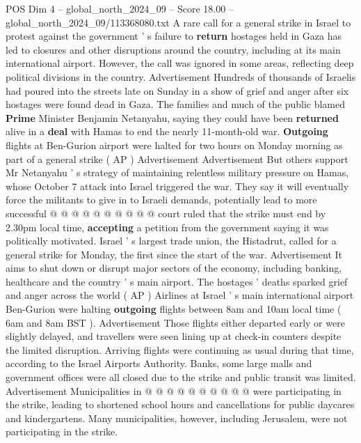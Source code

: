 \begin{textsample}{POS Dim 4 – global\_north\_2024\_09 – Score 18.00 – global\_north\_2024\_09/113368080.txt}  \label{ex:f4_pos_329}
A rare call for a general strike in Israel to protest against the government ' s failure to \textbf{return} hostages held in Gaza has led to closures and other disruptions around the country, including at its main international airport.
However, the call was ignored in some areas, reflecting deep political divisions in the country.
Advertisement Hundreds of thousands of Israelis had poured into the streets late on Sunday in a show of grief and anger after six hostages were found dead in Gaza.
The families and much of the public blamed \textbf{Prime} Minister Benjamin Netanyahu, saying they could have been \textbf{returned} alive in a \textbf{deal} with Hamas to end the nearly 11-month-old war. \textbf{Outgoing} flights at Ben-Gurion airport were halted for two hours on Monday morning as part of a general strike ( AP ) Advertisement Advertisement But others support Mr Netanyahu ' s strategy of maintaining relentless military pressure on Hamas, whose October 7 attack into Israel triggered the war.
They say it will eventually force the militants to give in to Israeli demands, potentially lead to more successful @ @ @ @ @ @ @ @ @ @ court ruled that the strike must end by 2.30pm local time, \textbf{accepting} a petition from the government saying it was politically motivated.
Israel ' s largest trade union, the Histadrut, called for a general strike for Monday, the first since the start of the war.
Advertisement It aims to shut down or disrupt major sectors of the economy, including banking, healthcare and the country ' s main airport.
The hostages ' deaths sparked grief and anger across the world ( AP ) Airlines at Israel ' s main international airport Ben-Gurion were halting \textbf{outgoing} flights between 8am and 10am local time ( 6am and 8am BST ).
Advertisement Those flights either departed early or were slightly delayed, and travellers were seen lining up at check-in counters despite the limited disruption.
Arriving flights were continuing as usual during that time, according to the Israel Airports Authority.
Banks, some large malls and government offices were all closed due to the strike and public transit was limited.
Advertisement Municipalities in @ @ @ @ @ @ @ @ @ @ were participating in the strike, leading to shortened school hours and cancellations for public daycares and kindergartens.
Many municipalities, however, including Jerusalem, were not participating in the strike.

\end{textsample}

